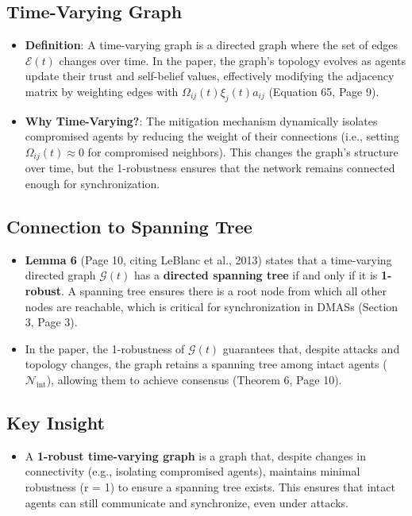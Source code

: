 \documentclass{article}
\begin{document}
\subsection{Time-Varying Graph}
\begin{itemize}
    \item \textbf{Definition}: A time-varying graph is a directed graph where the set of edges $\mathcal{E}(t)$ changes over time. In the paper, the graph's topology evolves as agents update their trust and self-belief values, effectively modifying the adjacency matrix by weighting edges with $\Omega_{ij}(t) \xi_j(t) a_{ij}$ (Equation 65, Page 9).
    
    \item \textbf{Why Time-Varying?}: The mitigation mechanism dynamically isolates compromised agents by reducing the weight of their connections (i.e., setting $\Omega_{ij}(t) \approx 0$ for compromised neighbors). This changes the graph's structure over time, but the 1-robustness ensures that the network remains connected enough for synchronization.
\end{itemize}

\subsection{Connection to Spanning Tree}
\begin{itemize}
    \item \textbf{Lemma 6} (Page 10, citing LeBlanc et al., 2013) states that a time-varying directed graph $\mathcal{G}(t)$ has a \textbf{directed spanning tree} if and only if it is \textbf{1-robust}. A spanning tree ensures there is a root node from which all other nodes are reachable, which is critical for synchronization in DMASs (Section 3, Page 3).
    
    \item In the paper, the 1-robustness of $\mathcal{G}(t)$ guarantees that, despite attacks and topology changes, the graph retains a spanning tree among intact agents ($\mathcal{N}_{\text{int}}$), allowing them to achieve consensus (Theorem 6, Page 10).
\end{itemize}

\subsection{Key Insight}
\begin{itemize}
    \item A \textbf{1-robust time-varying graph} is a graph that, despite changes in connectivity (e.g., isolating compromised agents), maintains minimal robustness (r = 1) to ensure a spanning tree exists. This ensures that intact agents can still communicate and synchronize, even under attacks.
\end{itemize}
\end{document}
